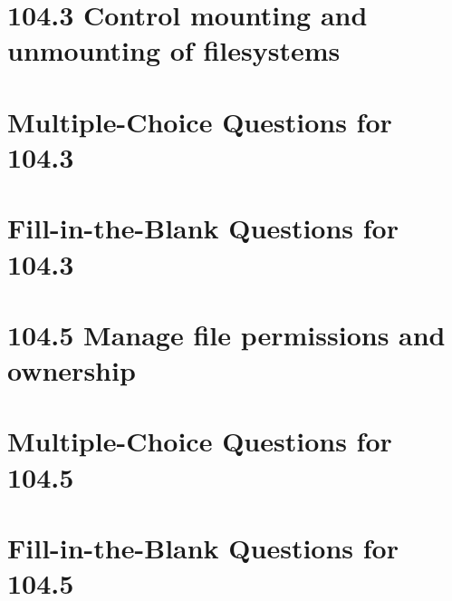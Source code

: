 \documentclass[a4paper]{report}
\begin{document}
\newpage
\section*{104.3 Control mounting and unmounting of filesystems}

\newpage
\section*{Multiple-Choice Questions for 104.3}

\newpage
\section*{Fill-in-the-Blank Questions for 104.3}

\newpage
\section*{104.5 Manage file permissions and ownership}

\newpage
\section*{Multiple-Choice Questions for 104.5}

\newpage
\section*{Fill-in-the-Blank Questions for 104.5}
\end{document}
